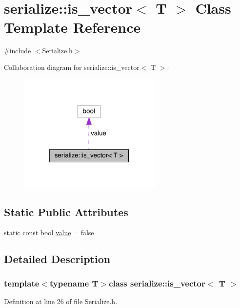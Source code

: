 \hypertarget{classserialize_1_1is__vector}{}\section{serialize\+:\+:is\+\_\+vector$<$ T $>$ Class Template Reference}
\label{classserialize_1_1is__vector}


{\ttfamily \#include $<$Serialize.\+h$>$}



Collaboration diagram for serialize\+:\+:is\+\_\+vector$<$ T $>$\+:
\nopagebreak
\begin{figure}[H]
\begin{center}
\leavevmode
\includegraphics[width=202pt]{classserialize_1_1is__vector__coll__graph}
\end{center}
\end{figure}
\subsection*{Static Public Attributes}
\begin{DoxyCompactItemize}
\item 
static const bool \hyperlink{classserialize_1_1is__vector_ad0b95082b20edc56d4884e210a7ab985}{value} = false
\end{DoxyCompactItemize}


\subsection{Detailed Description}
\subsubsection*{template$<$typename T$>$class serialize\+::is\+\_\+vector$<$ T $>$}



Definition at line 26 of file Serialize.\+h.



